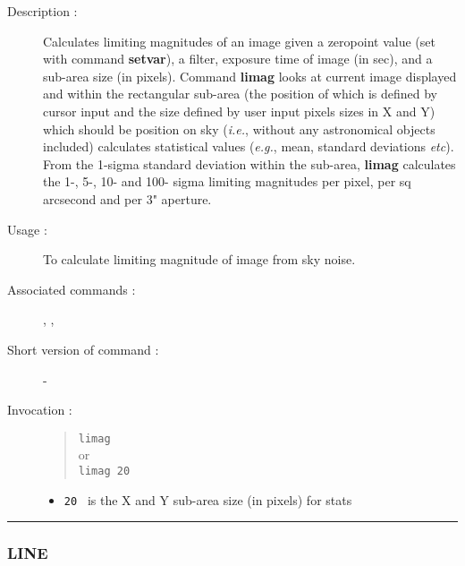 \begin{description}

\item[Description :] Calculates limiting magnitudes of an image given a
zeropoint value (set with command {\bf setvar}), a filter, exposure time of
image (in sec), and a sub-area size (in pixels). Command {\bf limag} looks at
current image displayed and within the rectangular sub-area (the
position of which is defined by cursor input and the size defined by
user input pixels sizes in X and Y) which should be position on sky
(\emph{i.e.}, without any astronomical objects included) calculates
statistical values (\emph{e.g.}, mean, standard deviations \emph{etc}).
From the 1-sigma standard deviation within the sub-area, {\bf limag}
calculates the 1-, 5-, 10- and 100- sigma limiting magnitudes per
pixel, per sq arcsecond and per 3" aperture.

\item[Usage :] To calculate limiting magnitude of image from sky noise.
\item[Associated commands :] {\tt {}},
{\tt {}}, {\tt {}}
\item[Short version of command :] -
\item[Invocation :]

\begin{quote}{\tt  limag }\\
or \\
{\tt limag 20 }
\end{quote}

\begin{itemize}

\item {\tt 20 } is the X and Y sub-area size (in pixels) for stats
\end{itemize}

\end{description}

\hrule
\subsubsection*{\label{LINE}LINE}

